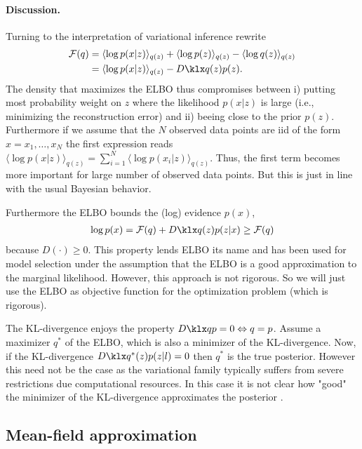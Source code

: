 \paragraph{Discussion.}Turning to the interpretation of variational inference rewrite
\begin{align}
	\mathcal{F}(q) &= \langle \log p(x | z) \rangle _{q(z)} + \langle \log p(z) \rangle _{q(z)}  - \langle \log q(z) \rangle _{q(z)} \nonumber \\ 
	        &= \langle \log p(x | z) \rangle _{q(z)} - \kl{q(z)}{p(z)}.
\end{align}
The density that maximizes the ELBO thus compromises between  i) putting most probability weight on $z$ where the likelihood $p(x|z)$ is large (i.e., minimizing the reconstruction error) and ii) beeing close to the prior $p(z)$. Furthermore if we assume that the $N$ observed data points are iid of the form $x = x_1, \dots, x_N$  the first expression reads $\langle \log p(x | z) \rangle _{q(z)} = \sum _{i = 1} ^N\langle \log p(x_i | z) \rangle _{q(z)}$. Thus, the first term becomes more important for large number of observed data points. But this is just in line with the usual Bayesian behavior.

Furthermore the ELBO bounds the (log) evidence $p(x)$,
\begin{align}
	\log p(x) = \mathcal{F}(q) + \kl{q(z)}{p(z|x)} \geq \mathcal{F}(q)
\end{align}
because $D(\cdot) \geq 0$. This property lends ELBO its name and has been used for model selection under the assumption that the ELBO is a good approximation to the marginal likelihood. However, this approach is not rigorous. So we will just use the ELBO as objective function for the optimization problem (which is rigorous).

The KL-divergence enjoys the property $\kl{q}{p} = 0 \Leftrightarrow q=p$. Assume a maximizer $q^*$ of the ELBO, which is also a minimizer of the KL-divergence. Now, if the KL-divergence  $\kl{q^*(z)}{p(z|l)} = 0$ then $q^*$ is the true posterior. However this need not be the case as the variational family typically suffers from severe restrictions due computational resources. In this case it is not clear how "good" the minimizer of the KL-divergence approximates the posterior \cite{minka2005divergence, Leisink01atighter}.

\subsection{Mean-field approximation}

